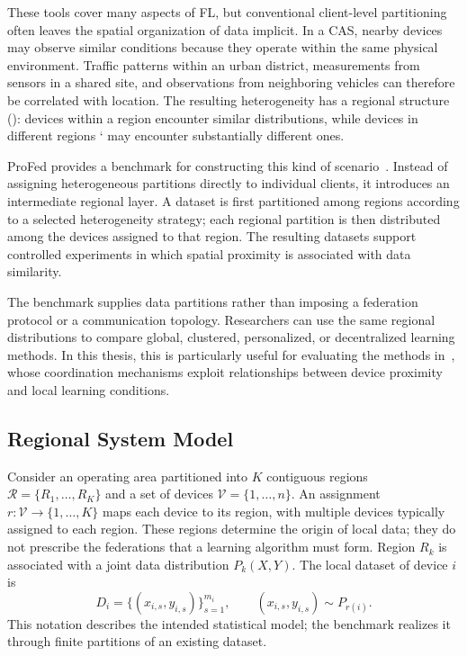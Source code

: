 These tools cover many aspects of \gls{FL}, 
 but conventional client-level partitioning often leaves 
 the spatial organization of data implicit.
%
In a \gls{CAS}, nearby devices may observe similar conditions because they
 operate within the same physical environment.
%
Traffic patterns within an urban district, measurements from sensors in a
 shared site, and observations from neighboring vehicles can therefore be
 correlated with location.
%
The resulting heterogeneity has a regional structure (): 
 devices within a region encounter similar distributions, 
 while devices in different regions ` may encounter substantially different ones.

ProFed provides a benchmark for constructing this kind of
 scenario~\cite{DBLP:journals/jors/DominiIALV26}.
%
Instead of assigning heterogeneous partitions directly to individual clients,
 it introduces an intermediate regional layer.
%
A dataset is first partitioned among regions according to a selected
 heterogeneity strategy; each regional partition is then distributed among
 the devices assigned to that region.
%
The resulting datasets support controlled experiments in which spatial
 proximity is associated with data similarity.

The benchmark supplies data partitions rather than imposing a federation
 protocol or a communication topology.
%
Researchers can use the same regional distributions to compare global,
 clustered, personalized, or decentralized learning methods.
%
In this thesis, this is particularly useful for evaluating the methods
 in~, whose coordination mechanisms exploit relationships
 between device proximity and local learning conditions.

\subsection{Regional System Model}
\label{sec:profed-system-model}

Consider an operating area partitioned into $K$ contiguous regions
 $\mathcal{R}=\{R_1,\ldots,R_K\}$ and a set of devices
 $\mathcal{V}=\{1,\ldots,n\}$.
%
An assignment $r:\mathcal{V}\rightarrow\{1,\ldots,K\}$ maps each device
 to its region, with multiple devices typically assigned to each region.
%
These regions determine the origin of local data; they do not prescribe
 the federations that a learning algorithm must form.
%
Region $R_k$ is associated with a joint data distribution $P_k(X,Y)$.
%
The local dataset of device $i$ is
\begin{equation}
  D_i=\{(x_{i,s},y_{i,s})\}_{s=1}^{m_i},
  \qquad (x_{i,s},y_{i,s})\sim P_{r(i)}.
  \label{eq:profed-local-data}
\end{equation}
This notation describes the intended statistical model; the benchmark
 realizes it through finite partitions of an existing dataset.

